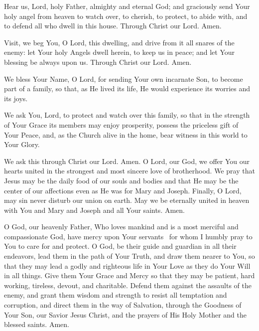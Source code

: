 Hear us, Lord, holy Father, almighty and eternal God;
and graciously send Your holy angel from heaven to watch over, to cherish, to protect, to abide with, and to defend all who dwell in this house.
Through Christ our Lord. Amen.

Visit, we beg You, O Lord, this dwelling, and drive from it all snares of the enemy:
let Your holy Angels dwell herein, to keep us in peace;
and let Your blessing be always upon us.
Through Christ our Lord.
Amen.

We bless Your Name, O Lord, for sending Your own incarnate Son, to become part of a family, so that, as He lived its life, He would experience its worries and its joys.

We ask You, Lord, to protect and watch over this family, so that in the strength of Your Grace its members may enjoy prosperity, possess the priceless gift of Your Peace, and, as the Church alive in the home, bear witness in this world to Your Glory.

We ask this through Christ our Lord.
Amen.
\newpage
{}
O Lord, our God, we offer You our hearts united in the strongest and most sincere love of brotherhood.
We pray that Jesus may be the daily food of our souls and bodies and that He may be the center of our affections even as He was for Mary and Joseph.
Finally, O Lord, may sin never disturb our union on earth.
May we be eternally united in heaven with You and Mary and Joseph and all Your saints.
Amen.

O God, our heavenly Father, Who loves mankind and is a most merciful and compassionate God, have mercy upon Your servants \myfamilyandfriends\ for whom I humbly pray to You to care for and protect.
O God, be their guide and guardian in all their endeavors, lead them in the path of Your Truth, and draw them nearer to You, so that they may lead a godly and righteous life in Your Love as they do Your Will in all things.
Give them Your Grace and Mercy so that they may be patient, hard working, tireless, devout, and charitable.
Defend them against the assaults of the enemy, and grant them wisdom and strength to resist all temptation and corruption, and direct them in the way of Salvation, through the Goodness of Your Son, our Savior Jesus Christ, and the prayers of His Holy Mother and the blessed saints.
Amen.

